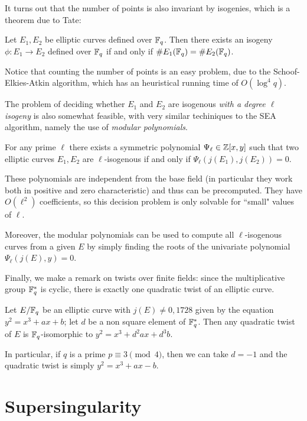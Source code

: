 It turns out that the number of points is also invariant by isogenies, which is a theorem due to Tate:
\begin{theorem}
    Let $E_1,E_2$ be elliptic curves defined over $\mathbb{F}_q$. Then there exists an isogeny $\phi: E_1\to E_2$ defined over $\mathbb{F}_q$ if and only if $\# E_1(\mathbb{F}_q)=\# E_2(\mathbb{F}_q)$.
\end{theorem}

Notice that counting the number of points is an easy problem, due to the Schoof-Elkies-Atkin algorithm, which has an heuristical running time of $O(\log^4 q)$.

The problem of deciding whether $E_1$ and $E_2$ are isogenous \emph{with a degree $\ell$ isogeny} is also somewhat feasible, with very similar techiniques to the SEA algorithm, namely the use of \emph{modular polynomials}.

\begin{theorem}
    For any prime $\ell$ there exists a symmetric polynomial $\Psi_\ell\in\mathbb{Z}[x,y]$ such that two elliptic curves $E_1,E_2$ are $\ell$-isogenous if and only if $\Psi_\ell(j(E_1),j(E_2))=0$.
\end{theorem}

These polynomials are independent from the base field (in particular they work both in positive and zero characteristic) and thus can be precomputed. They have $O(\ell^2)$ coefficients, so this decision problem is only solvable for ``small" values of $\ell$.

Moreover, the modular polynomials can be used to compute all $\ell$-isogenous curves from a given $E$ by simply finding the roots of the univariate polynomial $\Psi_\ell(j(E),y)=0$.

Finally, we make a remark on twists over finite fields: since the multiplicative group $\mathbb{F}_q^\ast$ is cyclic, there is exactly one quadratic twist of an elliptic curve.
\begin{proposition}
    Let $E/\mathbb{F}_q$ be an elliptic curve with $j(E)\neq0,1728$ given by the equation $y^2=x^3+ax+b$; let $d$ be a non square element of $\mathbb{F}_q^\ast$. Then any quadratic twist of $E$ is $\mathbb{F}_q$-isomorphic to $y^2=x^3+d^2ax+d^3b$.
\end{proposition}
In particular, if $q$ is a prime $p\equiv3\pmod4$, then we can take $d=-1$ and the quadratic twist is simply $y^2=x^3+ax-b$.

\section{Supersingularity}

